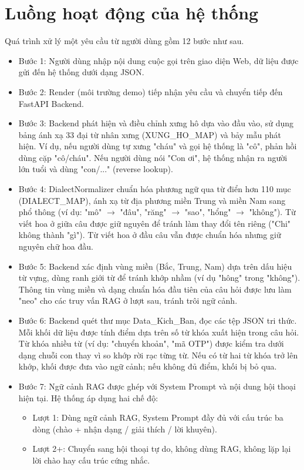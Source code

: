 \section{Luồng hoạt động của hệ thống}
Quá trình xử lý một yêu cầu từ người dùng gồm 12 bước như sau.
\begin{itemize}
    \item Bước 1: Người dùng nhập nội dung cuộc gọi trên giao diện Web, dữ liệu được gửi đến hệ thống dưới dạng JSON.

    \item Bước 2: Render (môi trường demo) tiếp nhận yêu cầu và chuyển tiếp đến FastAPI Backend.

    \item Bước 3: Backend phát hiện và điều chỉnh xưng hô dựa vào đầu vào, sử dụng bảng ánh xạ 33 đại từ nhân xưng (XUNG\_HO\_MAP) và bảy mẫu phát hiện. Ví dụ, nếu người dùng tự xưng "cháu" và gọi hệ thống là "cô", phản hồi dùng cặp "cô/cháu". Nếu người dùng nói "Con ơi", hệ thống nhận ra người lớn tuổi và dùng "con/..." (reverse lookup).

    \item Bước 4: DialectNormalizer chuẩn hóa phương ngữ qua từ điển hơn 110 mục (DIALECT\_MAP), ánh xạ từ địa phương miền Trung và miền Nam sang phổ thông (ví dụ: "mô" $\rightarrow$ "đâu", "răng" $\rightarrow$ "sao", "hổng" $\rightarrow$ "không"). Từ viết hoa ở giữa câu được giữ nguyên để tránh làm thay đổi tên riêng ("Chi" không thành "gì"). Từ viết hoa ở đầu câu vẫn được chuẩn hóa nhưng giữ nguyên chữ hoa đầu.

    \item Bước 5: Backend xác định vùng miền (Bắc, Trung, Nam) dựa trên dấu hiệu từ vựng, dùng ranh giới từ để tránh khớp nhầm (ví dụ "hông" trong "không"). Thông tin vùng miền và dạng chuẩn hóa đầu tiên của câu hỏi được lưu làm "neo" cho các truy vấn RAG ở lượt sau, tránh trôi ngữ cảnh.

    \item Bước 6: Backend quét thư mục Data\_Kich\_Ban, đọc các tệp JSON tri thức. Mỗi khối dữ liệu được tính điểm dựa trên số từ khóa xuất hiện trong câu hỏi. Từ khóa nhiều từ (ví dụ: "chuyển khoản", "mã OTP") được kiểm tra dưới dạng chuỗi con thay vì so khớp rời rạc từng từ. Nếu có từ hai từ khóa trở lên khớp, khối được đưa vào ngữ cảnh; nếu không đủ điểm, khối bị bỏ qua.

    \item Bước 7: Ngữ cảnh RAG được ghép với System Prompt và nội dung hội thoại hiện tại. Hệ thống áp dụng hai chế độ:
    \begin{itemize}
        \item Lượt 1: Dùng ngữ cảnh RAG, System Prompt đầy đủ với cấu trúc ba dòng (chào + nhận dạng / giải thích / lời khuyên).
        \item Lượt 2+: Chuyển sang hội thoại tự do, không dùng RAG, không lặp lại lời chào hay cấu trúc cứng nhắc.
    \end{itemize}


\end{itemize}
